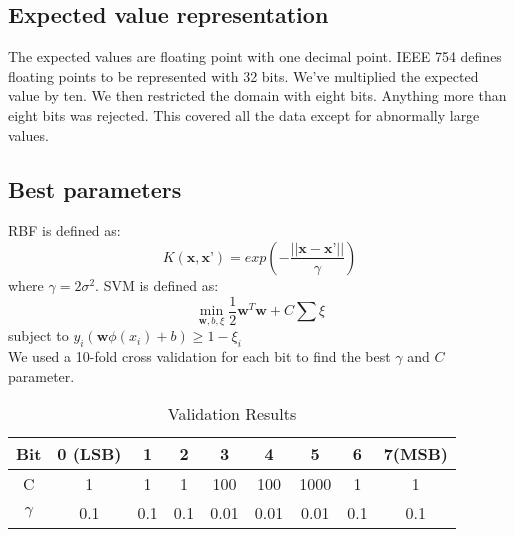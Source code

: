\documentclass[pdftex,a4paper,11pt]{article}
\begin{document}
\subsection{Expected value representation}
The expected values are floating point with one decimal point.  IEEE 754 defines floating points to be represented with 32 bits.  We've multiplied the expected value by ten.  We then restricted the domain with eight bits.  Anything more than eight bits was rejected.  This covered all the data except for abnormally large values.
 \subsection{Best parameters}
 RBF is defined as: 
$$K(\textbf{x},\textbf{x'}) = exp(-\frac{||\textbf{x} - \textbf{x'} ||}{\gamma} )$$ where $\gamma = 2\sigma^2$\cite{vert2004primer}.  SVM is defined as:
\begin{equation}
\mathop{min}_{\textbf{w}, b, \textbf{$\xi$} } \frac{1}{2} \textbf{w}^T\textbf{w} + C\sum {\xi}
\end{equation}
subject to $y_i(\textbf{w}\phi(x_i) + b) \geq 1 - \xi_i$ \cite{LIBSVM}\\
We used a 10-fold cross validation for each bit to find the best $\gamma$ and $C$ parameter.

\begin{table}[h]
{\centering
\begin{tabular}{|c|c|c|c|c|c|c|c|c|} \hline
Bit			&	0 (LSB)	&	1	&	2	&	3	&	4	&	5	&	6	&	7(MSB) 	\\	\hline
C			&	1	&	1	&	1	&	100	&	100	&	1000	&	1	&	1		\\	\hline
$\gamma$	&	0.1	&	0.1	&	0.1	&	0.01	&	0.01	&	0.01	&	0.1	&	0.1	\\	\hline

\end{tabular}
\caption{Validation Results}          
\label{table:valresults}}
\end{table}
\end{document}
